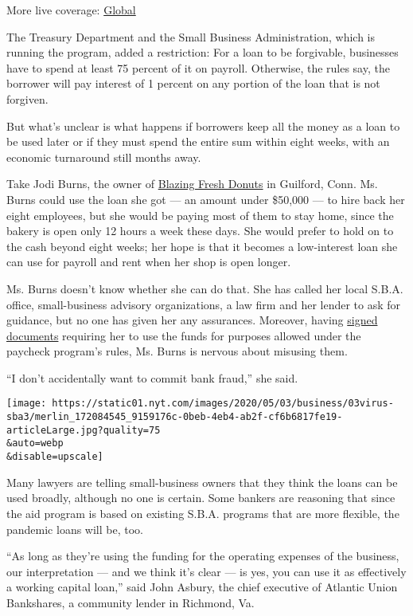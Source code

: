 More live coverage:
\href{https://www.nytimes.com/2020/08/17/world/covid-19-coronavirus.html?action=click\&pgtype=Article\&state=default\&region=MAIN_CONTENT_1\&context=storylines_live_updates}{Global}

The Treasury Department and the Small Business Administration, which is
running the program, added a restriction: For a loan to be forgivable,
businesses have to spend at least 75 percent of it on payroll.
Otherwise, the rules say, the borrower will pay interest of 1 percent on
any portion of the loan that is not forgiven.

But what's unclear is what happens if borrowers keep all the money as a
loan to be used later or if they must spend the entire sum within eight
weeks, with an economic turnaround still months away.

Take Jodi Burns, the owner of
\href{https://www.blazingfreshdonuts.com/}{Blazing Fresh Donuts} in
Guilford, Conn. Ms. Burns could use the loan she got --- an amount under
\$50,000 --- to hire back her eight employees, but she would be paying
most of them to stay home, since the bakery is open only 12 hours a week
these days. She would prefer to hold on to the cash beyond eight weeks;
her hope is that it becomes a low-interest loan she can use for payroll
and rent when her shop is open longer.

Ms. Burns doesn't know whether she can do that. She has called her local
S.B.A. office, small-business advisory organizations, a law firm and her
lender to ask for guidance, but no one has given her any assurances.
Moreover, having
\href{https://home.treasury.gov/system/files/136/PPP-Borrower-Application-Form-Fillable.pdf}{signed
documents} requiring her to use the funds for purposes allowed under the
paycheck program's rules, Ms. Burns is nervous about misusing them.

``I don't accidentally want to commit bank fraud,'' she said.

\texttt{[image: https://static01.nyt.com/images/2020/05/03/business/03virus-sba3/merlin\_172084545\_9159176c-0beb-4eb4-ab2f-cf6b6817fe19-articleLarge.jpg?quality=75\\\&auto=webp\\\&disable=upscale]}

Many lawyers are telling small-business owners that they think the loans
can be used broadly, although no one is certain. Some bankers are
reasoning that since the aid program is based on existing S.B.A.
programs that are more flexible, the pandemic loans will be, too.

``As long as they're using the funding for the operating expenses of the
business, our interpretation --- and we think it's clear --- is yes, you
can use it as effectively a working capital loan,'' said John Asbury,
the chief executive of Atlantic Union Bankshares, a community lender in
Richmond, Va.

